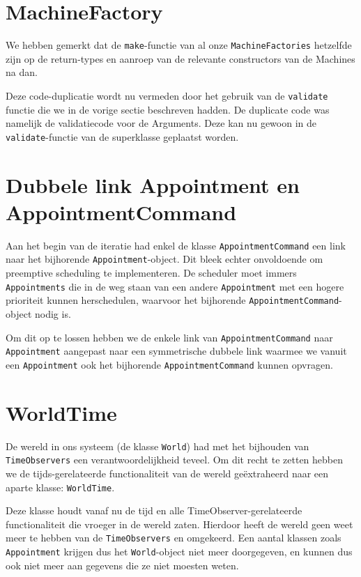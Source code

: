 \documentclass[a4paper]{article}
\begin{document}
\section{MachineFactory}
We hebben gemerkt dat de \texttt{make}-functie van al onze \texttt{MachineFactories} hetzelfde zijn op de return-types en aanroep van de relevante constructors van de Machines na dan.

Deze code-duplicatie wordt nu vermeden door het gebruik van de \texttt{validate} functie die we in de vorige sectie beschreven hadden. De duplicate code was namelijk de validatiecode voor de Arguments. Deze kan nu gewoon in de \texttt{validate}-functie van de superklasse geplaatst worden.

\section{Dubbele link Appointment en AppointmentCommand}
Aan het begin van de iteratie had enkel de klasse \texttt{AppointmentCommand} een link naar het bijhorende \texttt{Appointment}-object. Dit bleek echter onvoldoende om preemptive scheduling te implementeren. De scheduler moet immers \texttt{Appointments} die in de weg staan van een andere \texttt{Appointment} met een hogere prioriteit kunnen herschedulen, waarvoor het bijhorende \texttt{AppointmentCommand}-object nodig is.

Om dit op te lossen hebben we de enkele link van \texttt{AppointmentCommand} naar \texttt{Appointment} aangepast naar een symmetrische dubbele link waarmee we vanuit een \texttt{Appointment} ook het bijhorende \texttt{AppointmentCommand} kunnen opvragen.

\section{WorldTime}
De wereld in ons systeem (de klasse \texttt{World}) had met het bijhouden van \texttt{TimeObservers} een verantwoordelijkheid teveel. Om dit recht te zetten hebben we de tijds-gerelateerde functionaliteit van de wereld ge\"{e}xtraheerd naar een aparte klasse: \texttt{WorldTime}.

Deze klasse houdt vanaf nu de tijd en alle {TimeObserver}-gerelateerde functionaliteit die vroeger in de wereld zaten. Hierdoor heeft de wereld geen weet meer te hebben van de \texttt{TimeObservers} en omgekeerd. Een aantal klassen zoals \texttt{Appointment} krijgen dus het \texttt{World}-object niet meer doorgegeven, en kunnen dus ook niet meer aan gegevens die ze niet moesten weten.
\end{document}

